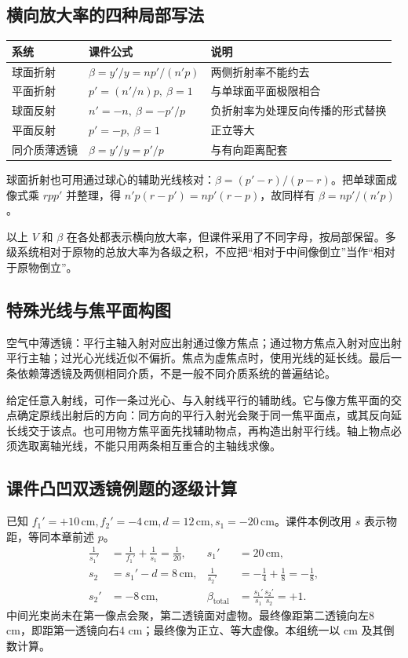 \documentclass[UTF8,fontset=none,zihao=-4,a4paper]{ctexart}
\newcommand{\unit}[1]{\,\mathrm{#1}}
\begin{document}
\subsection{横向放大率的四种局部写法}
\begin{center}
\begin{tabularx}{\linewidth}{l Y Y}
\toprule
系统 & 课件公式 & 说明\\
\midrule
球面折射 & $\beta=y'/y=np'/(n'p)$ & 两侧折射率不能约去\\
平面折射 & $p'=(n'/n)p,\ \beta=1$ & 与单球面平面极限相合\\
球面反射 & $n'=-n,\ \beta=-p'/p$ & 负折射率为处理反向传播的形式替换\\
平面反射 & $p'=-p,\ \beta=1$ & 正立等大\\
同介质薄透镜 & $\beta=y'/y=p'/p$ & 与有向距离配套\\
\bottomrule
\end{tabularx}
\end{center}
球面折射也可用通过球心的辅助光线核对：$\beta=(p'-r)/(p-r)$。把单球面成像式乘 $rpp'$ 并整理，得 $n'p(r-p')=np'(r-p)$，故同样有 $\beta=np'/(n'p)$。

以上 $V$ 和 $\beta$ 在各处都表示横向放大率，但课件采用了不同字母，按局部保留。多级系统相对于原物的总放大率为各级之积，不应把“相对于中间像倒立”当作“相对于原物倒立”。

\subsection{特殊光线与焦平面构图}
空气中薄透镜：平行主轴入射对应出射通过像方焦点；通过物方焦点入射对应出射平行主轴；过光心光线近似不偏折。焦点为虚焦点时，使用光线的延长线。最后一条依赖薄透镜及两侧相同介质，不是一般不同介质系统的普遍结论。

给定任意入射线，可作一条过光心、与入射线平行的辅助线。它与像方焦平面的交点确定原线出射后的方向：同方向的平行入射光会聚于同一焦平面点，或其反向延长线交于该点。也可用物方焦平面先找辅助物点，再构造出射平行线。轴上物点必须选取离轴光线，不能只用两条相互重合的主轴线求像。

\subsection{课件凸凹双透镜例题的逐级计算}
已知 $f_1'=+10\unit{cm},f_2'=-4\unit{cm},d=12\unit{cm},s_1=-20\unit{cm}$。课件本例改用 $s$ 表示物距，等同本章前述 $p$。
\begin{align*}
 \frac1{s_1'}&=\frac1{f_1'}+\frac1{s_1}=\frac1{20},
 &s_1'&=20\unit{cm},\\
 s_2&=s_1'-d=8\unit{cm},
 &\frac1{s_2'}&=-\frac14+\frac18=-\frac18,\\
 s_2'&=-8\unit{cm},
 &\beta_{\mathrm{total}}&=\frac{s_1'}{s_1}\frac{s_2'}{s_2}=+1.
\end{align*}
中间光束尚未在第一像点会聚，第二透镜面对虚物。最终像距第二透镜向左8 cm，即距第一透镜向右4 cm；最终像为正立、等大虚像。本组统一以 cm 及其倒数计算。
\end{document}
